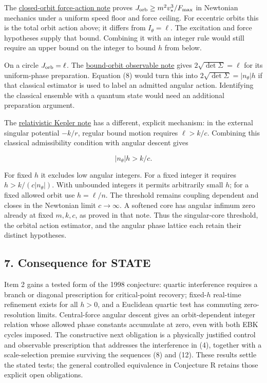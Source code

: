 \documentclass[11pt,a4paper]{article}
\begin{document}
The
\href{action-unit-dimensional-selection.md\#a-sharp-excitation-and-force-bound-for-all-closed-regular-orbits}{closed-orbit
force-action note} proves \(J_{\rm orb}\ge m^2v_*^3/F_{\max}\) in
Newtonian mechanics under a uniform speed floor and force ceiling. For
eccentric orbits this is the total orbit action above; it differs from
\(I_\theta=\ell\). The excitation and force hypotheses supply that
bound. Combining it with an integer rule would still require an upper
bound on the integer to bound \(h\) from below.

On a circle \(J_{\rm orb}=\ell\). The
\href{action-unit-dimensional-selection.md\#a-prepared-orbit-covariance-and-transport-response}{bound-orbit
observable note} gives \(2\sqrt{\det\Sigma}=\ell\) for its uniform-phase
preparation. Equation (8) would turn this into
\(2\sqrt{\det\Sigma}=|n_\theta|h\) if that classical estimator is used
to label an admitted angular action. Identifying the classical ensemble
with a quantum state would need an additional preparation argument.

The
\href{action-unit-dimensional-selection.md\#singular-and-softened-relativistic-coulomb-cores}{relativistic
Kepler note} has a different, explicit mechanism: in the external
singular potential \(-k/r\), regular bound motion requires \(\ell>k/c\).
Combining this classical admissibility condition with angular descent
gives

\[|n_\theta|h>k/c.\]

For fixed \(h\) it excludes low angular integers. For a fixed integer it
requires \(h>k/(c|n_\theta|)\). With unbounded integers it permits
arbitrarily small \(h\); for a fixed allowed orbit use \(h=\ell/n\). The
threshold remains coupling dependent and closes in the Newtonian limit
\(c\to\infty\). A softened core has angular infimum zero already at
fixed \(m,k,c\), as proved in that note. Thus the singular-core
threshold, the orbital action estimator, and the angular phase lattice
each retain their distinct hypotheses.

\hypertarget{consequence-for-state}{%
\subsection{7. Consequence for STATE}\label{consequence-for-state}}

Item 2 gains a tested form of the 1998 conjecture: quartic interference
requires a branch or diagonal prescription for critical-point recovery;
fixed-\(h\) real-time refinement exists for all \(h>0\), and a Euclidean
quartic test has commuting zero-resolution limits. Central-force angular
descent gives an orbit-dependent integer relation whose allowed phase
constants accumulate at zero, even with both EBK cycles imposed. The
constructive next obligation is a physically justified control and
observable prescription that addresses the interference in (4), together
with a scale-selection premise surviving the sequences (8) and (12).
These results settle the stated tests; the general controlled
equivalence in Conjecture R retains those explicit open obligations.
\end{document}
